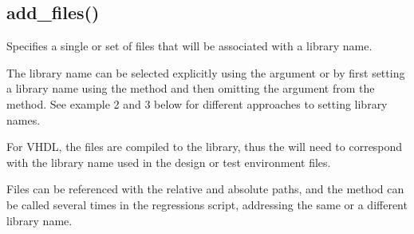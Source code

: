 \documentclass[letterpaper,10pt,english]{sphinxmanual}
\begin{document}
\subsection{add\_files()}
\label{\detokenize{api:add-files}}
\begin{DUlineblock}{0em}
\item[] Specifies a single or set of files that will be associated with a library name.
\item[] The library name can be selected explicitly using the  argument or by first setting a library name
using the {\hyperref[\detokenize{api:set-library}]{}} method and then omitting the  argument from the  method.
See example 2 and 3 below for different approaches to setting library names.
\item[] For VHDL, the files are compiled to the  library, thus the  will need to correspond
with the library name used in the design or test environment files.
\end{DUlineblock}

\sphinxAtStartPar
Files can be referenced with the relative and absolute paths, and the {\hyperref[\detokenize{api:add-files}]{}} method
can be called several times in the regressions script, addressing the same or a different library name.

\begin{sphinxVerbatim}[commandchars=\\\{\}]
     

\end{sphinxVerbatim}
\end{document}
